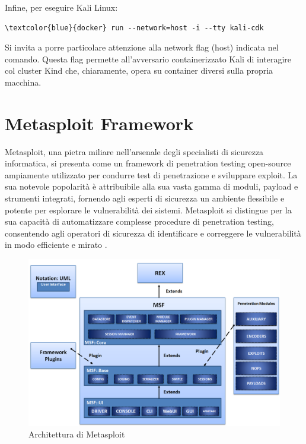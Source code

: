 Infine, per eseguire Kali Linux:

\begin{small}
\begin{Verbatim}[commandchars=\\\{\}]
\textcolor{blue}{docker} run --network=host -i --tty kali-cdk
\end{Verbatim}
\end{small}

Si invita a porre particolare attenzione alla network flag (host) indicata nel comando. Questa flag permette all'avversario containerizzato Kali di interagire col cluster Kind che, chiaramente, opera su container diversi sulla propria macchina.

\section{Metasploit Framework}

Metasploit, una pietra miliare nell'arsenale degli specialisti di sicurezza informatica, si presenta come un framework di penetration testing open-source ampiamente utilizzato per condurre test di penetrazione e sviluppare exploit. La sua notevole popolarità è attribuibile alla sua vasta gamma di moduli, payload e strumenti integrati, fornendo agli esperti di sicurezza un ambiente flessibile e potente per esplorare le vulnerabilità dei sistemi. Metasploit si distingue per la sua capacità di automatizzare complesse procedure di penetration testing, consentendo agli operatori di sicurezza di identificare e correggere le vulnerabilità in modo efficiente e mirato \cite{metasploit_framework}.

\begin{figure}[H]
    \centering
    \includegraphics[width=\linewidth]{figures/ch4and5/msf.png}
    \caption[Architettura di Metasploit]{Architettura di Metasploit}
    \label{fig:cha6:msf}
\end{figure}

